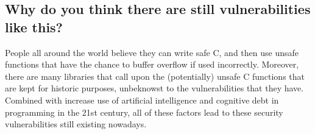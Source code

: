 \documentclass[12pt, letterpaper]{article}
\begin{document}
\subsection*{Why do you think there are still vulnerabilities like this?}

People all around the world believe they can write safe C, and then use unsafe functions that have the chance to buffer overflow if used incorrectly. Moreover, there are many libraries that call upon the (potentially) unsafe C functions that are kept for historic purposes, unbeknowst to the vulnerabilities that they have. Combined with increase use of artificial intelligence and cognitive debt in programming in the 21st century, all of these factors lead to these security vulnerabilities still existing nowadays.
\end{document}
